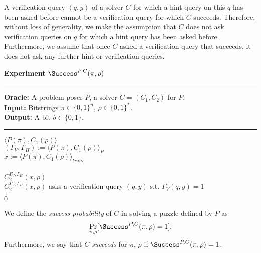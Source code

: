 A verification query $(q,y)$ of a solver $C$ for which a hint query on this $q$ has been asked before cannot be a verification query for which $C$ succeeds.
Therefore, without loss of generality, we make the assumption that $C$ does not ask verification queries on $q$
for which a hint query has been asked before. Furthermore, we assume that once $C$ asked a verification query that succeeds,
it does not ask any further hint or verification queries.
%
\begin{codeblock}
  \textbf{Experiment} $\Success^{P, C}(\pi, \rho)$
  \medskip \hrule
  \textbf{Oracle:} A problem poser $P$, a solver $C = (C_1, C_2)$ for $P$.\\
  \textbf{Input:}  Bitstrings $\pi \in \{0,1\}^n$, $\rho \in \{0,1\}^*$.\\
  \textbf{Output:} A bit $b \in \{0,1\}$.
  \medskip\hrule\medskip
  \Run $\langle P(\pi), C_1(\rho) \rangle$ \\
  \IndI $(\Gamma_V, \Gamma_H) := \langle P(\pi), C_1(\rho) \rangle_{P}$ \\
  \IndI $x := \langle P(\pi), C_1(\rho) \rangle_{\mathit{trans}}$ \\ \\
  \Run $C_2^{\Gamma_V,\Gamma_H}(x, \rho)$ \\
  \IndI \If $C_2^{\Gamma_V, \Gamma_H}(x, \rho)$ asks a verification query $(q, y)$ s.t. $\Gamma_V(q, y) = 1$ \Then \\
  \IndII \Return $1$ \\
  \Return $0$ \\
\end{codeblock}
%
We define the \textit{success probability} of $C$ in solving a puzzle defined by $P$ as
\begin{align}
 \underset{\pi, \rho}{\Pr}[\Success^{P,C}(\pi, \rho) = 1].
\end{align}
Furthermore, we say that $C$ \textit{succeeds} for $\pi$, $\rho$ if $\Success^{P,C}(\pi, \rho) = 1$.
%
